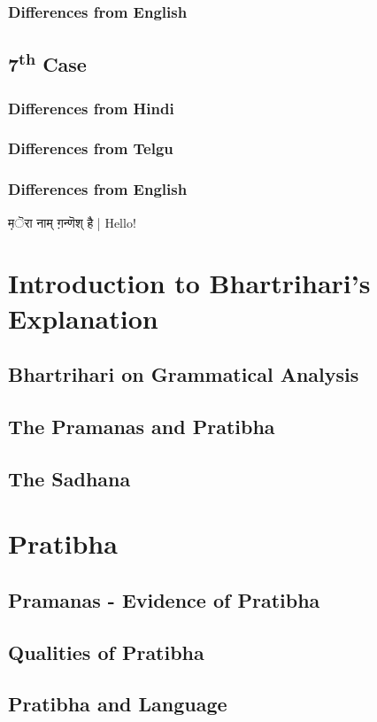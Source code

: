 \documentclass[a4paper,10pt]{article}
\begin{document}
\subsubsection{Differences from English}
\subsection{7\textsuperscript{th} Case}
\subsubsection{Differences from Hindi}
\subsubsection{Differences from Telgu}
\subsubsection{Differences from English}
{\d मॆरा नाम् ग़न्णॆश् है |} Hello!


\newpage
\section{Introduction to Bhartrihari's Explanation}
\subsection{Bhartrihari on Grammatical Analysis}
\subsection{The Pramanas and Pratibha}
\subsection{The Sadhana}
\section{Pratibha}
\subsection{Pramanas - Evidence of Pratibha}
\subsection{Qualities of Pratibha}
\subsection{Pratibha and Language}
\end{document}

